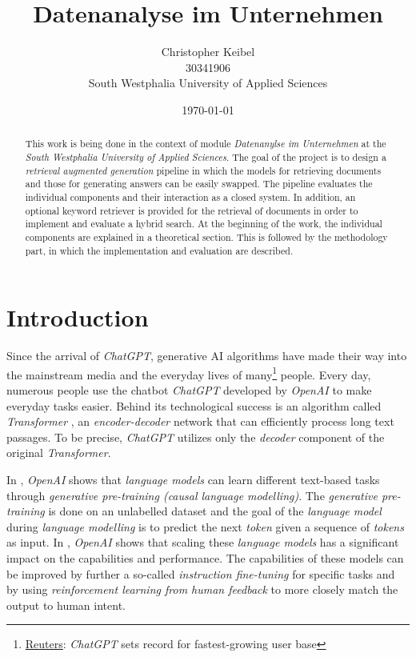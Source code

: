\documentclass{article}
\title{Datenanalyse im Unternehmen}
\author{Christopher Keibel \\ 30341906 \\South Westphalia University of Applied Sciences }
\date{\today}
\begin{document}
\maketitle

\begin{abstract}
This work is being done in the context of module \textit{Datenanylse im Unternehmen} at the \textit{South Westphalia University of Applied Sciences}. The goal of the project is to design a \textit{retrieval augmented generation} pipeline in which the models for retrieving documents and those for generating answers can be easily swapped. The pipeline evaluates the individual components and their interaction as a closed system. In addition, an optional keyword retriever is provided for the retrieval of documents in order to implement and evaluate a hybrid search. At the beginning of the work, the individual components are explained in a theoretical section. This is followed by the methodology part, in which the implementation and evaluation are described. 
\end{abstract}

\newpage

\tableofcontents
\newpage
{}
\section{Introduction} \label{Introduction}
Since the arrival of \textit{ChatGPT}, generative AI algorithms have made their way into the mainstream media and the everyday lives of many\footnote{\href{https://www.reuters.com/technology/chatgpt-sets-record-fastest-growing-user-base-analyst-note-2023-02-01/}{Reuters}: \textit{ChatGPT} sets record for fastest-growing user base} people. Every day, numerous people use the chatbot \textit{ChatGPT} developed by \textit{OpenAI} to make everyday tasks easier. Behind its technological success is an algorithm called \textit{Transformer} \cite{attentionIsAllYouNeed}, an \textit{encoder-decoder} network that can efficiently process long text passages. To be precise, \textit{ChatGPT} utilizes only the \textit{decoder}\cite{GPT1} component of the original \textit{Transformer}.

In \cite{GPT1, GPT2}, \textit{OpenAI} shows that \textit{language models} can learn different text-based tasks through \textit{generative pre-training (causal language modelling)}. The \textit{generative pre-training} is done on an unlabelled dataset and the goal of the \textit{language model} during \textit{language modelling} is to predict the next \textit{token} given a sequence of \textit{tokens} as input. In \cite{GPT3}, \textit{OpenAI} shows that scaling these \textit{language models} has a significant impact on the capabilities and performance. The capabilities of these models can be improved by further a so-called \textit{instruction fine-tuning} \cite{instructionFineTuning} for specific tasks and by using \textit{reinforcement learning from human feedback} \cite{RLHF} to more closely match the output to human intent.
\end{document}
